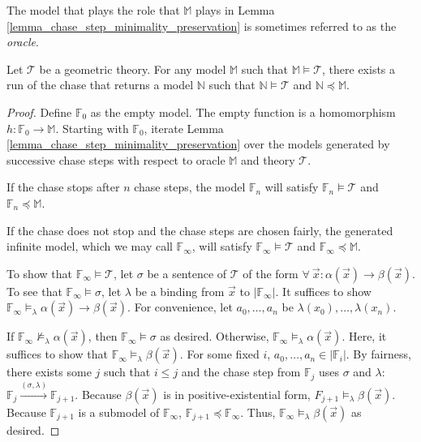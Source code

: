 		The model that plays the role that $\mathbb{M}$ plays in Lemma
		\ref{lemma_chase_step_minimality_preservation} is sometimes referred to
		as the \emph{oracle}.

		\begin{theorem}
			Let $\mathcal{T}$ be a geometric theory. For any model $\mathbb{M}$ such that
			$\mathbb{M} \models \mathcal{T}$, there exists a run of the chase that
			returns a model $\mathbb{N}$ such that $\mathbb{N} \models \mathcal{T}$ and
			$\mathbb{N} \preceq \mathbb{M}$.
		\end{theorem}

		\begin{proof}
			Define $\mathbb{F}_0$ as the empty model. The empty function is a
			homomorphism $h : \mathbb{F}_0 \to \mathbb{M}$. Starting with
			$\mathbb{F}_0$, iterate Lemma
			\ref{lemma_chase_step_minimality_preservation} over the models
			generated by successive chase steps with respect to oracle
			$\mathbb{M}$ and theory $\mathcal{T}$.

			If the chase stops after $n$ chase steps, the model $\mathbb{F}_n$
			will satisfy $\mathbb{F}_n \models \mathcal{T}$ and $\mathbb{F}_n
			\preceq \mathbb{M}$.

			If the chase does not stop and the chase steps are chosen fairly,
			the generated infinite model, which we may call
			$\mathbb{F}_\infty$, will satisfy $\mathbb{F}_\infty \models
			\mathcal{T}$ and $\mathbb{F}_\infty \preceq \mathbb{M}$.

			To show that $\mathbb{F}_\infty \models \mathcal{T}$, let $\sigma$
			be a sentence of $\mathcal{T}$ of the form $\forall\ \vec{x} :
			\alpha(\vec x) \to \beta(\vec x)$. To see that $\mathbb{F}_\infty
			\models \sigma$, let $\lambda$ be a binding from $\vec x$ to
			$|\mathbb{F}_\infty|$. It suffices to show $\mathbb{F}_\infty
			\models_\lambda \alpha(\vec x) \to \beta(\vec x)$. For convenience,
			let $a_0,\ldots,a_n$ be $\lambda(x_0),\ldots,\lambda(x_n)$.

			If $\mathbb{F}_\infty \not\models_\lambda \alpha(\vec x)$, then
			$\mathbb{F}_\infty \models \sigma$ as desired.  Otherwise,
			$\mathbb{F}_\infty \models_\lambda \alpha(\vec x)$.  Here, it
			suffices to show that $\mathbb{F}_\infty \models_\lambda \beta(\vec
			x)$. For some fixed $i$, $a_0,\ldots,a_n \in |\mathbb{F}_i|$. By
			fairness, there exists some $j$ such that $i \le j$ and the chase
			step from $\mathbb{F}_j$ uses $\sigma$ and $\lambda$: $\mathbb{F}_j
			\xrightarrow{(\sigma,\lambda)} \mathbb{F}_{j+1}$. Because
			$\beta(\vec x)$ is in positive-existential form, $F_{j+1}
			\models_\lambda \beta(\vec x)$.  Because $\mathbb{F}_{j+1}$ is a
			submodel of $\mathbb{F}_\infty$, $\mathbb{F}_{j+1} \preceq
			\mathbb{F}_\infty$. Thus, $\mathbb{F}_\infty \models_\lambda
			\beta(\vec x)$ as desired.
		\end{proof}

